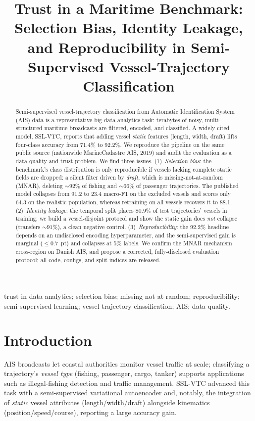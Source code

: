 \documentclass[conference,flushend]{iaria} %
\title{Trust in a Maritime Benchmark: Selection Bias, Identity Leakage, and Reproducibility in Semi-Supervised Vessel-Trajectory Classification}
\author{
  \IEEEauthorblockN{%
    Jane Smith and John Doe\,\orcidlink{0000-0002-1175-2668}}
  \IEEEauthorblockA{%
    Department of Computer Science\\
    University of …\\
    City, Country\\
    e-mail: {\tt$\lbrace$j.smith\,|\,j.doe$\rbrace$@example.org}
} }
\begin{document}
\maketitle

\begin{abstract}
Semi-supervised vessel-trajectory classification from Automatic Identification
System (AIS) data is a representative big-data analytics task: terabytes of noisy,
multi-structured maritime broadcasts are filtered, encoded, and classified. A
widely cited model, SSL-VTC, reports that adding vessel \emph{static} features
(length, width, draft) lifts four-class accuracy from 71.4\% to 92.2\%. We
reproduce the pipeline on the same public source (nationwide MarineCadastre AIS,
2019) and audit the evaluation as a data-quality and trust problem. We find three
issues. (1)~\emph{Selection bias}: the benchmark's class distribution is only
reproducible if vessels lacking complete static fields are dropped: a silent
filter driven by \emph{draft}, which is missing-not-at-random (MNAR), deleting
${\sim}92\%$ of fishing and ${\sim}66\%$ of passenger trajectories. The published
model collapses from 91.2 to 23.4 macro-F1 on the excluded vessels and scores only
64.3 on the realistic population, whereas retraining on all vessels recovers it to
88.1. (2)~\emph{Identity leakage}: the temporal split places 80.9\% of test
trajectories' vessels in training; we build a vessel-disjoint protocol and show the
static gain does \emph{not} collapse (transfers ${\sim}91\%$), a clean negative
control. (3)~\emph{Reproducibility}: the 92.2\% headline depends on an undisclosed
encoding hyperparameter, and the semi-supervised gain is marginal ($\le0.7$~pt) and
collapses at 5\% labels. We confirm the MNAR mechanism cross-region on Danish AIS,
and propose a corrected, fully-disclosed evaluation protocol; all code, configs, and
split indices are released.
\end{abstract}

\begin{IEEEkeywords}
trust in data analytics; selection bias; missing not at random; reproducibility;
semi-supervised learning; vessel trajectory classification; AIS; data quality.
\end{IEEEkeywords}

\section{Introduction}
AIS broadcasts let coastal authorities monitor vessel traffic at scale; classifying
a trajectory's \emph{vessel type} (fishing, passenger, cargo, tanker) supports
applications such as illegal-fishing detection and traffic management. SSL-VTC
\cite{duan2022sslvtc} advanced this task with a semi-supervised variational
autoencoder and, notably, the integration of \emph{static} vessel attributes
(length/width/draft) alongside kinematics (position/speed/course), reporting a large
accuracy gain.
\end{document}
